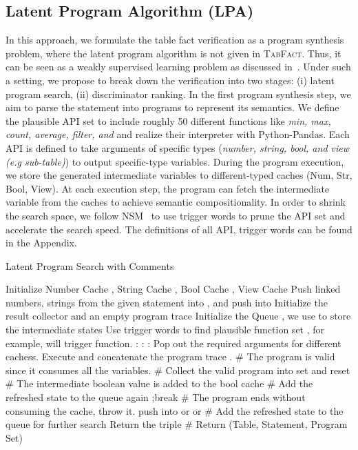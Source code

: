 \documentclass{article} \usepackage{iclr2020_conference,times}
\begin{document}
\subsection{Latent Program Algorithm (LPA)}
In this approach, we formulate the table fact verification as a program synthesis problem, where the latent program algorithm is not given in \textsc{TabFact}. Thus, it can be seen as a weakly supervised learning problem as discussed in~\citet{liang2017neural,lao2011random}. Under such a setting, we propose to break down the verification into two stages: (i) latent program search, (ii) discriminator ranking. 
In the first program synthesis step, we aim to parse the statement into programs to represent its semantics. We define the plausible API set to include roughly 50 different functions like \textit{min, max, count, average, filter, and} and realize their interpreter with Python-Pandas. Each API is defined to take arguments of specific types (\emph{number, string, bool, and view (e.g sub-table)}) to output specific-type variables. During the program execution, we store the generated intermediate variables to different-typed caches  (Num, Str, Bool, View). At each execution step, the program can fetch the intermediate variable from the caches to achieve semantic compositionality. In order to shrink the search space, we follow NSM~\citep{liang2017neural} to use trigger words to prune the API set and accelerate the search speed. The definitions of all API, trigger words can be found in the Appendix. 
\begin{algorithm}[thb]
\small
\caption{Latent Program Search with Comments}\label{alg:LPA}
\begin{algorithmic}[1]
\State Initialize Number Cache , String Cache , Bool Cache , View Cache  
\State Push linked numbers, strings from the given statement  into , and push  into 
\State Initialize the result collector  and an empty program trace 
\State Initialize the Queue , we use  to store the intermediate states
\State Use trigger words to find plausible function set , for example,  will trigger  function.
:
\While{}:
:
\State Pop out the required arguments  for different cachess.
\State Execute  and concatenate the program trace .
\If {}
\State  \# The program  is valid since it consumes all the variables.
\State  \# Collect the valid program  into set  and reset 
\Else
\State  \# The intermediate boolean value is added to the bool cache
\State  \# Add the refreshed state to the queue again
\EndIf
\EndIf
{}
\If {}
\State ;break \# The program ends without consuming the cache, throw it.
\Else
\State push  into  or  or  \# Add the refreshed state to the queue for further search
\State 
\EndIf
\EndIf
\EndIf
\EndWhile
\EndWhile
\EndWhile
\State Return the triple  \# Return (Table, Statement, Program Set)
\end{algorithmic}
\end{algorithm}
\end{document}
